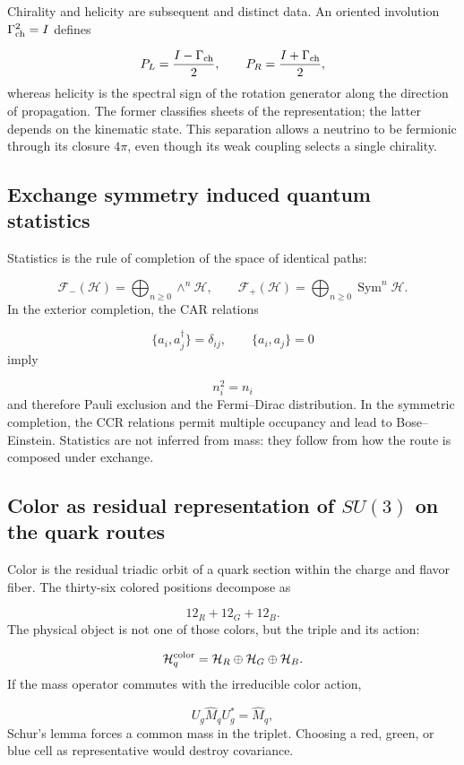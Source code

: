 Chirality and helicity are subsequent and distinct data. An oriented involution \(\Gamma_{\rm ch}^2=I\) defines

\[
 P_L=\frac{I-\Gamma_{\rm ch}}2,
 \qquad
 P_R=\frac{I+\Gamma_{\rm ch}}2,
\]
whereas helicity is the spectral sign of the rotation generator along the direction of propagation. The former classifies sheets of the representation; the latter depends on the kinematic state. This separation allows a neutrino to be fermionic through its closure \(4\pi\), even though its weak coupling selects a single chirality.

\subsection{Exchange symmetry induced quantum statistics}
Statistics is the rule of completion of the space of identical paths:

\[
 \mathcal F_-(\mathcal H)
 =\bigoplus_{n\ge0}\wedge^n\mathcal H,\qquad
 \mathcal F_+(\mathcal H)
 =\bigoplus_{n\ge0}\operatorname{Sym}^n\mathcal H.
\]
In the exterior completion, the CAR relations

\[
 \{a_i,a_j^\dagger\}=\delta_{ij},\qquad
 \{a_i,a_j\}=0
\]
imply

\[
 n_i^2=n_i
\]
and therefore Pauli exclusion and the Fermi--Dirac distribution. In the symmetric completion, the CCR relations permit multiple occupancy and lead to Bose--Einstein. Statistics are not inferred from mass: they follow from how the route is composed under exchange.

\subsection{Color as residual representation of \(SU(3)\) on the quark routes}
Color is the residual triadic orbit of a quark section within the charge and flavor fiber. The thirty-six colored positions decompose as

\[
 12_R+12_G+12_B.
\]
The physical object is not one of those colors, but the triple and its action:

\[
 \mathcal H_q^{\rm color}
 =\mathcal H_R\oplus\mathcal H_G\oplus\mathcal H_B.
\]
If the mass operator commutes with the irreducible color action,

\[
 U_g\widehat M_qU_g^*=\widehat M_q,
\]
Schur's lemma forces a common mass in the triplet. Choosing a red, green, or blue cell as representative would destroy covariance.

